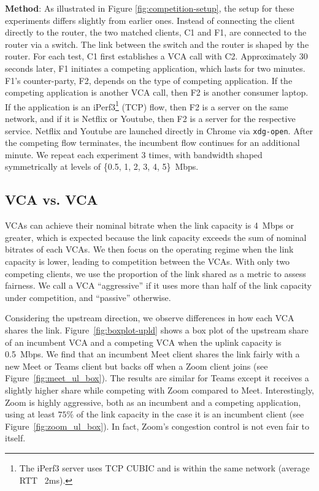 \noindent \textbf{Method}: As illustrated in Figure \ref{fig:competition-setup}, the setup for these experiments differs slightly from earlier ones. 
Instead of connecting the client directly to the router, the two matched clients, C1 and F1, are connected to the router via a switch. 
The link between the switch and the router is shaped by the router. For each test, C1 first establishes a VCA call with C2.
Approximately 30 seconds later, F1 initiates a competing application, which lasts for two minutes.
F1's counter-party, F2, depends on the type of competing application.
If the competing application is another VCA call, then F2 is another consumer laptop.
If the application is an iPerf3\footnote{The iPerf3 server uses TCP CUBIC and is  within the same network (average RTT ~2ms).} (TCP) flow, then F2 is a server on the same network,
  and if it is Netflix or Youtube, then F2 is a server for the respective service. Netflix and Youtube are launched directly in Chrome via \texttt{xdg-open}.
After the competing flow terminates, the incumbent flow continues for an additional minute.
We repeat each experiment 3 times, with bandwidth shaped symmetrically at levels of \{0.5, 1, 2, 3, 4, 5\}~Mbps.

\subsection{VCA vs. VCA}

VCAs can achieve their nominal bitrate when the link capacity is
4~Mbps or greater, which is expected because the link capacity exceeds the sum of
nominal bitrates of each VCAs. We then focus on the operating regime when the link
capacity is lower, leading to competition between the VCAs. 
With only two competing clients, we use the proportion of the link shared as a
metric to assess fairness. We call a VCA ``aggressive'' if it uses more than
half of the link capacity under competition, and ``passive'' otherwise.

Considering the upstream direction, we observe differences in how each VCA shares the
link. Figure~\ref{fig:boxplot-upld} shows a box plot of the upstream share of
an incumbent VCA and a competing VCA when the uplink capacity is 0.5~Mbps.  We
find that an incumbent Meet client shares the link fairly with a new Meet or
Teams client but backs off when a Zoom client joins (see
Figure~\ref{fig:meet_ul_box}). The results are similar for Teams except it
receives a slightly higher share while competing with Zoom compared to Meet.
Interestingly, Zoom is highly aggressive, both as an incumbent and a competing
application, using at least $75\%$ of the link capacity in the case it is an
incumbent client (see Figure~\ref{fig:zoom_ul_box}). In fact, Zoom's
congestion control is not even fair to itself.

